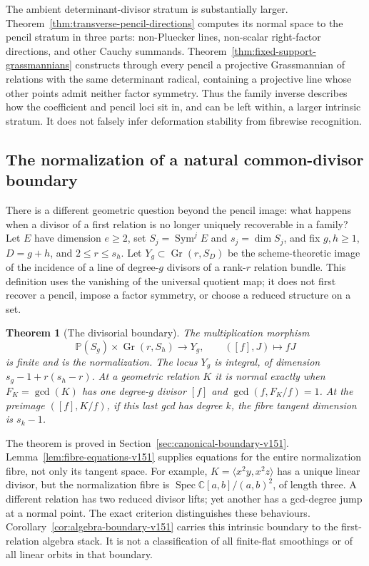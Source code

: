 \documentclass[11pt,reqno]{amsart}
\numberwithin{equation}{section}
\newtheorem{theorem}{Theorem}[section]
\theoremstyle{definition}\newtheorem{definition}[theorem]{Definition}
\theoremstyle{remark}\newtheorem{remark}[theorem]{Remark}
\newcommand{\C}{\mathbb C}\newcommand{\Q}{\mathbb Q}
\newcommand{\Pj}{\mathbb P}\newcommand{\A}{\mathbb A}
\DeclareMathOperator{\Sym}{Sym}\DeclareMathOperator{\Gr}{Gr}
\DeclareMathOperator{\Spec}{Spec}\DeclareMathOperator{\PGL}{PGL}
\begin{document}
The ambient determinant-divisor stratum is substantially larger.
Theorem~\ref{thm:transverse-pencil-directions} computes its normal
space to the pencil stratum in three parts: non-Pluecker lines,
non-scalar right-factor directions, and other Cauchy summands.
Theorem~\ref{thm:fixed-support-grassmannians} constructs through every
pencil a projective Grassmannian of relations with the same determinant
radical, containing a projective line whose other points admit neither
factor symmetry.  Thus the family inverse describes how the
coefficient and pencil loci sit in, and can be left within, a larger
intrinsic stratum.  It does not falsely infer deformation stability
from fibrewise recognition.

\subsection{The normalization of a natural common-divisor boundary}
There is a different geometric question beyond the pencil image:
what happens when a divisor of a first relation is no longer uniquely
recoverable in a family?  Let \(E\) have dimension \(e\geq2\), set
\(S_j=\Sym^jE\) and \(s_j=\dim S_j\), and fix
\(g,h\geq1\), \(D=g+h\), and \(2\leq r\leq s_h\).
Let \(Y_g\subset\Gr(r,S_D)\) be the scheme-theoretic image of the
incidence of a line of degree-\(g\) divisors of a rank-\(r\) relation
bundle.  This definition uses the vanishing of the universal quotient
map; it does not first recover a pencil, impose a factor symmetry,
or choose a reduced structure on a set.

\begin{theorem}[The divisorial boundary]
\label{thm:principal-boundary-v151}
The multiplication morphism
\[
 \Pj(S_g)\times\Gr(r,S_h)\longrightarrow Y_g,
                         \qquad ([f],J)\longmapsto fJ
\]
is finite and is the normalization.  The locus \(Y_g\) is integral,
of dimension \(s_g-1+r(s_h-r)\).  At a geometric relation \(K\)
it is normal exactly when \(F_K=\gcd(K)\) has one degree-\(g\)
divisor \([f]\) and \(\gcd(f,F_K/f)=1\).
At the preimage \(([f],K/f)\), if this last gcd has degree \(k\),
the fibre tangent dimension is \(s_k-1\).
\end{theorem}

The theorem is proved in Section~\ref{sec:canonical-boundary-v151}.
Lemma~\ref{lem:fibre-equations-v151} supplies equations for the
entire normalization fibre, not only its tangent space.  For example,
\(K=\langle x^2y,x^2z\rangle\) has a unique linear divisor, but the
normalization fibre is \(\Spec\C[a,b]/(a,b)^2\), of length three.
A different relation has two reduced divisor lifts; yet another has
a gcd-degree jump at a normal point.  The exact criterion distinguishes
these behaviours.  Corollary~\ref{cor:algebra-boundary-v151} carries
this intrinsic boundary to the first-relation algebra stack.  It is
not a classification of all finite-flat smoothings or of all linear
orbits in that boundary.
\end{document}
